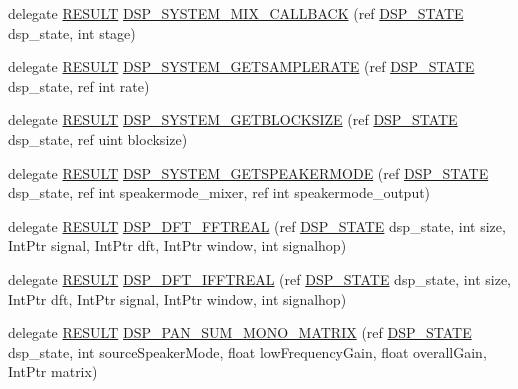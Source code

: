 \begin{DoxyCompactItemize}
\item 
delegate \hyperlink{namespace_f_m_o_d_a305d1176ef3f8c8815861a60407ac33d}{R\+E\+S\+U\+LT} \hyperlink{namespace_f_m_o_d_a641bcff8485031584c905220518b4e7c}{D\+S\+P\+\_\+\+S\+Y\+S\+T\+E\+M\+\_\+\+M\+I\+X\+\_\+\+C\+A\+L\+L\+B\+A\+CK} (ref \hyperlink{struct_f_m_o_d_1_1_d_s_p___s_t_a_t_e}{D\+S\+P\+\_\+\+S\+T\+A\+TE} dsp\+\_\+state, int stage)
\item 
delegate \hyperlink{namespace_f_m_o_d_a305d1176ef3f8c8815861a60407ac33d}{R\+E\+S\+U\+LT} \hyperlink{namespace_f_m_o_d_a892b2030dd288ab45b132806cb408f33}{D\+S\+P\+\_\+\+S\+Y\+S\+T\+E\+M\+\_\+\+G\+E\+T\+S\+A\+M\+P\+L\+E\+R\+A\+TE} (ref \hyperlink{struct_f_m_o_d_1_1_d_s_p___s_t_a_t_e}{D\+S\+P\+\_\+\+S\+T\+A\+TE} dsp\+\_\+state, ref int rate)
\item 
delegate \hyperlink{namespace_f_m_o_d_a305d1176ef3f8c8815861a60407ac33d}{R\+E\+S\+U\+LT} \hyperlink{namespace_f_m_o_d_aecdb732d16df868ecab07e57334b8278}{D\+S\+P\+\_\+\+S\+Y\+S\+T\+E\+M\+\_\+\+G\+E\+T\+B\+L\+O\+C\+K\+S\+I\+ZE} (ref \hyperlink{struct_f_m_o_d_1_1_d_s_p___s_t_a_t_e}{D\+S\+P\+\_\+\+S\+T\+A\+TE} dsp\+\_\+state, ref uint blocksize)
\item 
delegate \hyperlink{namespace_f_m_o_d_a305d1176ef3f8c8815861a60407ac33d}{R\+E\+S\+U\+LT} \hyperlink{namespace_f_m_o_d_a4919c742fda4a52b284da7b14e12fbdc}{D\+S\+P\+\_\+\+S\+Y\+S\+T\+E\+M\+\_\+\+G\+E\+T\+S\+P\+E\+A\+K\+E\+R\+M\+O\+DE} (ref \hyperlink{struct_f_m_o_d_1_1_d_s_p___s_t_a_t_e}{D\+S\+P\+\_\+\+S\+T\+A\+TE} dsp\+\_\+state, ref int speakermode\+\_\+mixer, ref int speakermode\+\_\+output)
\item 
delegate \hyperlink{namespace_f_m_o_d_a305d1176ef3f8c8815861a60407ac33d}{R\+E\+S\+U\+LT} \hyperlink{namespace_f_m_o_d_aa012e977ef18d324c0c35f6b708c131d}{D\+S\+P\+\_\+\+D\+F\+T\+\_\+\+F\+F\+T\+R\+E\+AL} (ref \hyperlink{struct_f_m_o_d_1_1_d_s_p___s_t_a_t_e}{D\+S\+P\+\_\+\+S\+T\+A\+TE} dsp\+\_\+state, int size, Int\+Ptr signal, Int\+Ptr dft, Int\+Ptr window, int signalhop)
\item 
delegate \hyperlink{namespace_f_m_o_d_a305d1176ef3f8c8815861a60407ac33d}{R\+E\+S\+U\+LT} \hyperlink{namespace_f_m_o_d_acff7f43ee3fdbeba059b99619bb9f8f5}{D\+S\+P\+\_\+\+D\+F\+T\+\_\+\+I\+F\+F\+T\+R\+E\+AL} (ref \hyperlink{struct_f_m_o_d_1_1_d_s_p___s_t_a_t_e}{D\+S\+P\+\_\+\+S\+T\+A\+TE} dsp\+\_\+state, int size, Int\+Ptr dft, Int\+Ptr signal, Int\+Ptr window, int signalhop)
\item 
delegate \hyperlink{namespace_f_m_o_d_a305d1176ef3f8c8815861a60407ac33d}{R\+E\+S\+U\+LT} \hyperlink{namespace_f_m_o_d_af0cf7d431580d7f008accba401bd67be}{D\+S\+P\+\_\+\+P\+A\+N\+\_\+\+S\+U\+M\+\_\+\+M\+O\+N\+O\+\_\+\+M\+A\+T\+R\+IX} (ref \hyperlink{struct_f_m_o_d_1_1_d_s_p___s_t_a_t_e}{D\+S\+P\+\_\+\+S\+T\+A\+TE} dsp\+\_\+state, int source\+Speaker\+Mode, float low\+Frequency\+Gain, float overall\+Gain, Int\+Ptr matrix)

\end{DoxyCompactItemize}
